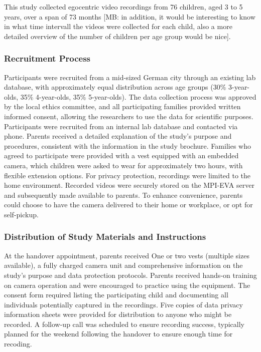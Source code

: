 \documentclass[
  man,floatsintext]{apa6}
\begin{document}
This study collected egocentric video recordings from 76 children, aged 3 to 5 years, over a span of 73 months {[}MB: in addition, it would be interesting to know in what time intervall the videos were collected for each child, also a more detailed overview of the number of children per age group would be nice{]}.

\subsubsection{Recruitment Process}\label{recruitment-process}

Participants were recruited from a mid-sized German city through an existing lab database, with approximately equal distribution across age groups (30\% 3-year-olds, 35\% 4-year-olds, 35\% 5-year-olds). The data collection process was approved by the local ethics committee, and all participating families provided written informed consent, allowing the researchers to use the data for scientific purposes. Participants were recruited from an internal lab database and contacted via phone. Parents received a detailed explanation of the study's purpose and procedures, consistent with the information in the study brochure. Families who agreed to participate were provided with a vest equipped with an embedded camera, which children were asked to wear for approximately two hours, with flexible extension options. For privacy protection, recordings were limited to the home environment. Recorded videos were securely stored on the MPI-EVA server and subsequently made available to parents. To enhance convenience, parents could choose to have the camera delivered to their home or workplace, or opt for self-pickup.

\subsubsection{Distribution of Study Materials and Instructions}\label{distribution-of-study-materials-and-instructions}

At the handover appointment, parents received One or two vests (multiple sizes available), a fully charged camera unit and comprehensive information on the study's purpose and data protection protocols. Parents received hands-on training on camera operation and were encouraged to practice using the equipment. The consent form required listing the participating child and documenting all individuals potentially captured in the recordings. Five copies of data privacy information sheets were provided for distribution to anyone who might be recorded. A follow-up call was scheduled to ensure recording success, typically planned for the weekend following the handover to ensure enough time for recoding.
\end{document}
